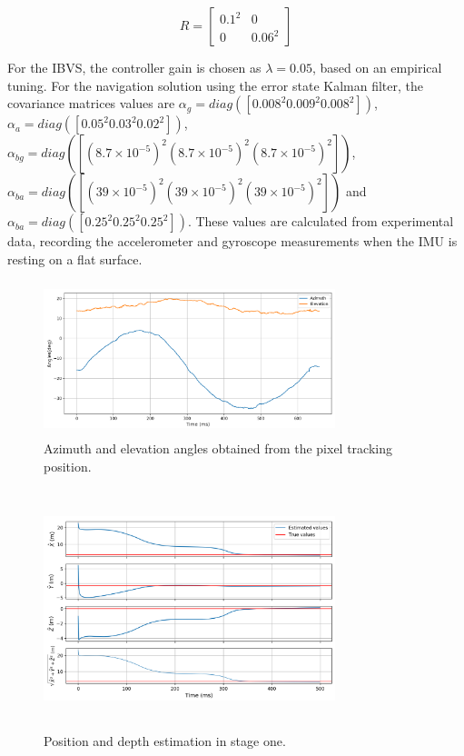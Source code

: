 \documentclass[conference]{IEEEtran}
\begin{document}
\begin{equation*}
R = \begin{bmatrix}  0.1^{2} & 0 \\
0 & 0.06^{2} \end{bmatrix}
\end{equation*}

For the IBVS, the controller gain is chosen as $\lambda = 0.05$, based on an empirical tuning. For the navigation solution using the error state Kalman filter, the covariance matrices values are $\alpha_{g} = diag([0.008^{2} 0.009^{2} 0.008^{2}])$, $\alpha_{a} = diag([0.05^{2} 0.03^{2} 0.02^{2}])$, $\alpha_{bg} = diag([(8.7\times10^{-5})^{2} (8.7\times10^{-5})^{2} (8.7\times10^{-5})^{2}])$, $\alpha_{ba} = diag([(39\times10^{-5})^{2} (39\times10^{-5})^{2} (39\times10^{-5})^{2}])$ and $\alpha_{ba} = diag([0.25^{2} 0.25^{2} 0.25^{2}])$. These values are calculated from experimental data, recording the accelerometer and gyroscope measurements when the IMU is resting on a flat surface.

\begin{figure}
\centering
\includegraphics[width=8.5cm, height=4.5cm]{Images/azimuth_elevation.png}
\caption{Azimuth and elevation angles obtained from the pixel tracking position.}
\label{azimuth_elevation}
\end{figure}

\begin{figure}
\centering
\includegraphics[width=8.5cm, height=7cm]{Images/tgt_depth_est.png}
\caption{Position and depth estimation in stage one.}
\label{tgt_depth_est}
\end{figure}
\end{document}
